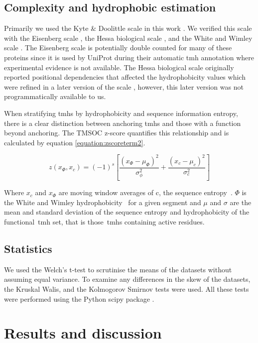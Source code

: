 \subsection{Complexity and hydrophobic estimation}
Primarily we used the Kyte \& Doolittle scale in this work \cite{Kyte1982}.
We verified this scale with the Eisenberg scale \cite{Eisenberg1984}, the Hessa biological scale \cite{Hessa2005}, and the White and Wimley scale \cite{White1999}.
The Eisenberg scale is potentially double counted for many of these proteins since it is used by UniProt during their automatic \gls{tmh} annotation where experimental evidence is not available.
The Hessa biological scale originally reported positional dependencies that affected the hydrophobicity values which were refined in a later version of the scale \cite{Hessa2007}, however, this later version was not programmatically available to us.

When stratifying \gls{tmh}s by hydrophobicity and sequence information entropy, there is a clear distinction between anchoring \gls{tmh}s and those with a function beyond anchoring.
The TMSOC z-score quantifies this relationship and is calculated by equation \ref{equation:zscoreterm2}.

\begin{equation} \label{zscoreterm2}
z({x}_{\Phi},{x}_{c})={(-1)}^{s}\left[\frac{{({x}_{\Phi}-{\mu}_{\Phi})}^{2}}{{\sigma}_{\phi}^{2}}+\frac{{({x}_{c}-{\mu}_{c})}^{2}}{{\sigma}_{c}^{2}}\right]
\end{equation}

Where $x_c$ and $x_\Phi$ are moving window averages of c, the sequence entropy~\cite{Wootton1996}. $\Phi$ is the White and Wimley hydrophobicity~\cite{White1999} for a given segment and $\mu$ and $\sigma$ are the mean and standard deviation of the sequence entropy and hydrophobicity of the functional~\gls{tmh} set, that is those~\gls{tmh}s containing active residues.

\subsection{Statistics}

We used the Welch's t\--test to scrutinise the means of the datasets without assuming equal variance.
To examine any differences in the skew of the datasets, the Kruskal Walis, and the Kolmogorov Smirnov tests were used.
All these tests were performed using the Python scipy package \cite{Oliphant2007}.


\section{Results and discussion}

